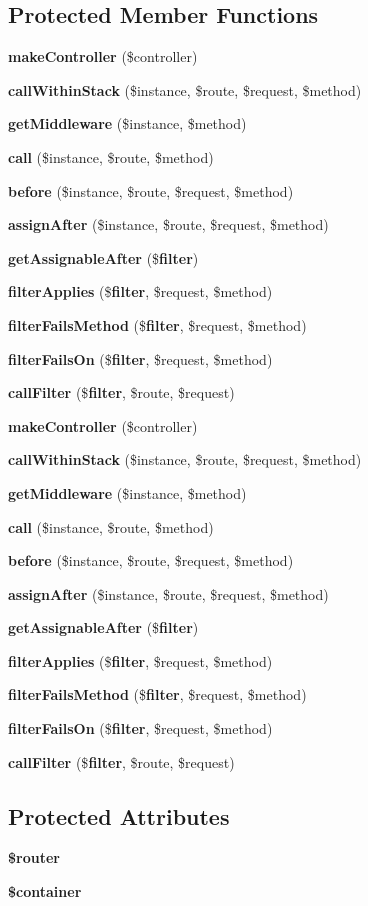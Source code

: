 \subsection*{Protected Member Functions}
\begin{DoxyCompactItemize}
\item 
{\bf make\+Controller} (\$controller)
\item 
{\bf call\+Within\+Stack} (\$instance, \$route, \$request, \$method)
\item 
{\bf get\+Middleware} (\$instance, \$method)
\item 
{\bf call} (\$instance, \$route, \$method)
\item 
{\bf before} (\$instance, \$route, \$request, \$method)
\item 
{\bf assign\+After} (\$instance, \$route, \$request, \$method)
\item 
{\bf get\+Assignable\+After} (\${\bf filter})
\item 
{\bf filter\+Applies} (\${\bf filter}, \$request, \$method)
\item 
{\bf filter\+Fails\+Method} (\${\bf filter}, \$request, \$method)
\item 
{\bf filter\+Fails\+On} (\${\bf filter}, \$request, \$method)
\item 
{\bf call\+Filter} (\${\bf filter}, \$route, \$request)
\item 
{\bf make\+Controller} (\$controller)
\item 
{\bf call\+Within\+Stack} (\$instance, \$route, \$request, \$method)
\item 
{\bf get\+Middleware} (\$instance, \$method)
\item 
{\bf call} (\$instance, \$route, \$method)
\item 
{\bf before} (\$instance, \$route, \$request, \$method)
\item 
{\bf assign\+After} (\$instance, \$route, \$request, \$method)
\item 
{\bf get\+Assignable\+After} (\${\bf filter})
\item 
{\bf filter\+Applies} (\${\bf filter}, \$request, \$method)
\item 
{\bf filter\+Fails\+Method} (\${\bf filter}, \$request, \$method)
\item 
{\bf filter\+Fails\+On} (\${\bf filter}, \$request, \$method)
\item 
{\bf call\+Filter} (\${\bf filter}, \$route, \$request)
\end{DoxyCompactItemize}
\subsection*{Protected Attributes}
\begin{DoxyCompactItemize}
\item 
{\bf \$router}
\item 
{\bf \$container}
\end{DoxyCompactItemize}


